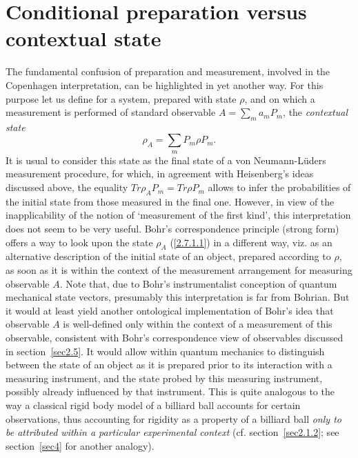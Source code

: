 \documentclass[12pt]{article}
\begin{document}
\section{Conditional preparation versus contextual state}
\label{sec2.7.1} The fundamental confusion of preparation
and measurement, involved in the Copenhagen interpretation, can
be highlighted in yet another way. For this purpose let us define
for a system, prepared with state $\rho$, and on which a
measurement is performed of standard observable $A=\sum_m a_m
P_m$, the {\em contextual state}
\begin{equation}\label{2.7.1.1}
\rho_A=\sum_m P_m \rho P_m.
\end{equation}
It is usual to consider this state as the final state of a von
Neumann-L\"uders measurement procedure, for which, in agreement
with Heisenberg's ideas discussed above, the equality $Tr \rho_A
P_m= Tr \rho P_m$ allows to infer the probabilities of the initial
state from those measured in the final one. However, in view of
the inapplicability of the notion of `measurement of the first
kind', this interpretation does not seem to be very useful. Bohr's correspondence principle (strong form) offers a way to look upon the state
$\rho_A$ (\ref{2.7.1.1}) in a different way, viz. as an
alternative description of the initial state of an object,
prepared according to $\rho$, as soon as it is within the context
of the measurement arrangement for measuring observable $A$. Note
that, due to Bohr's instrumentalist conception of quantum
mechanical state vectors, presumably this interpretation is far
from Bohrian. But it would at least yield another ontological
implementation of Bohr's idea that observable $A$ is well-defined
only within the context of a measurement of this observable,
consistent with Bohr's correspondence view of observables
discussed in section~\ref{sec2.5}. It would allow within quantum
mechanics to distinguish between the state of an object as it is
prepared prior to its interaction with a measuring instrument, and
the state probed by this measuring instrument, possibly already
influenced by that instrument. This is quite analogous to the way
a classical rigid body model of a billiard ball accounts for
certain observations, thus accounting for rigidity as a property
of a billiard ball {\em only to be attributed within a particular
experimental context} (cf. section~\ref{sec2.1.2}; see
section~\ref{sec4} for another analogy).
\end{document}
